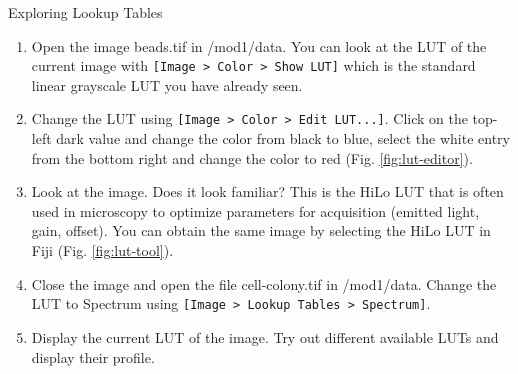 \begin{taskbox}{Exploring Lookup Tables}

\begin{enumerate}
	\item Open the image beads.tif in /mod1/data. You can look at the LUT of the current image with \texttt{[Image > Color > Show LUT]} which is the standard linear grayscale LUT you have already seen.
	\item Change the LUT using \texttt{[Image > Color > Edit LUT...]}. Click on the top-left dark value and change the color from black to blue,  select the white entry from the bottom right and change the color to red (Fig. \ref{fig:lut-editor}).
	
	\begin{minipage}[t]{\linewidth}
		\begin{center}
		\medskip
		\label{fig:lut-editor}
		\end{center}
	\end{minipage}
	
	\item Look at the image. Does it look familiar? This is the HiLo LUT that is often used in microscopy to optimize parameters for acquisition (emitted light, gain, offset). You can obtain the same image by selecting the HiLo LUT in Fiji (Fig. \ref{fig:lut-tool}).
	
	\begin{minipage}[t]{\linewidth}
		\begin{center}
		\medskip
		\label{fig:lut-tool}
		\end{center}
	\end{minipage}
	
	\item Close the image and open the file cell-colony.tif in /mod1/data. Change the LUT to Spectrum using \texttt{[Image > Lookup Tables > Spectrum]}.
	\item Display the current LUT of the image. Try out different available LUTs and display their profile.
\end{enumerate}

\end{taskbox}

